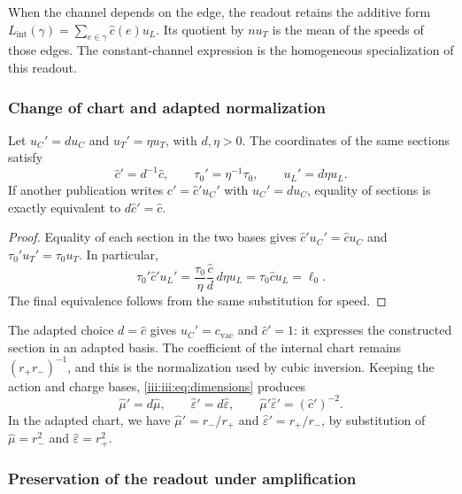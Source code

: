 When the channel depends on the edge, the readout retains the additive form
$L_{\mathrm{int}}(\gamma)=\sum_{e\in\gamma}\widehat c(e)u_L$.
Its quotient by $nu_T$ is the mean of the speeds of those edges.
The constant-channel expression is the homogeneous specialization of
this readout.

\subsubsection{Change of chart and adapted normalization}

\begin{proposition}
Let $u_C'=d u_C$ and $u_T'=\eta u_T$, with $d,\eta>0$.
The coordinates of the same sections satisfy
\begin{equation}
 \widehat c'=d^{-1}\widehat c,
 \qquad \tau_0'=\eta^{-1}\tau_0,
 \qquad u_L'=d\eta u_L.
 \label{iii:iii:eq:velocidad-cambio-carta}
\end{equation}
If another publication writes $c'=\widehat c' u_C'$ with $u_C'=d u_C$,
equality of sections is exactly equivalent to $d\widehat c'=\widehat c$.
\end{proposition}
\begin{proof}
Equality of each section in the two bases gives
$\widehat c'u_C'=\widehat c u_C$ and $\tau_0'u_T'=\tau_0u_T$.
In particular,
\[
 \tau_0'\widehat c'u_L'
 =\frac{\tau_0}{\eta}\frac{\widehat c}{d}\,d\eta u_L
 =\tau_0\widehat c u_L=\ell_0.
\]
The final equivalence follows from the same substitution for speed.
\end{proof}

The adapted choice $d=\widehat c$ gives $u_C'=c_{\mathrm{vac}}$ and
$\widehat c'=1$: it expresses the constructed section in an adapted basis.
The coefficient of the internal chart remains $(r_+r_-)^{-1}$, and this
is the normalization used by cubic inversion. Keeping the
action and charge bases, \eqref{iii:iii:eq:dimensions} produces
\[
 \widehat\mu'=d\widehat\mu,\qquad
 \widehat\varepsilon'=d\widehat\varepsilon,\qquad
 \widehat\mu'\widehat\varepsilon'=(\widehat c')^{-2}.
\]
In the adapted chart, we have $\widehat\mu'=r_-/r_+$ and
$\widehat\varepsilon'=r_+/r_-$, by substitution of
$\widehat\mu=r_-^2$ and $\widehat\varepsilon=r_+^2$.

\subsubsection{Preservation of the readout under amplification}

